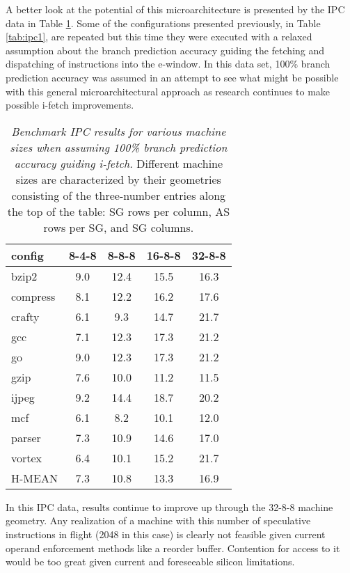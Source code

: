 \documentclass[10pt,dvips]{article}
\begin{document}
A better look at the potential of this microarchitecture is
presented by the IPC data in Table \ref{tab:ipc2}.
Some of the configurations presented previously, 
in Table \ref{tab:ipc1},
are repeated but this time they were executed with a relaxed
assumption about the branch prediction accuracy guiding the
fetching and dispatching of instructions into the e-window.
In this data set, 100\% branch prediction accuracy was
assumed in an attempt to see what might be possible with this
general microarchitectural approach as research continues to
make possible i-fetch improvements.
%
\begin{table}
\begin{center}
\caption{{\em Benchmark IPC results for various machine sizes
when assuming 100\% branch prediction accuracy guiding i-fetch.}
Different machine sizes are characterized by their
geometries consisting of the three-number entries along the
top of the table: SG rows per column, AS rows per SG, and
SG columns.}
\label{tab:ipc2}
\begin{tabular}{|l|c|c|c|c|}
\hline 
config&
8-4-8&8-8-8&16-8-8&32-8-8\\
\hline
\hline 
bzip2&9.0&12.4&15.5&16.3\\
\hline 
compress&8.1&12.2&16.2&17.6\\
\hline 
crafty&6.1&9.3&14.7&21.7\\
\hline 
gcc&7.1&12.3&17.3&21.2\\
\hline 
go&9.0&12.3&17.3&21.2\\
\hline 
gzip&7.6&10.0&11.2&11.5\\
\hline 
ijpeg&9.2&14.4&18.7&20.2\\
\hline 
mcf&6.1&8.2&10.1&12.0\\
\hline 
parser&7.3&10.9&14.6&17.0\\
\hline 
vortex&6.4&10.1&15.2&21.7\\
\hline 
\hline 
H-MEAN&7.3&10.8&13.3&16.9\\
\hline
\end{tabular}
\end{center}
\end{table}
%
In this IPC data, results continue to improve up through the
32-8-8 machine geometry.
Any realization of a machine with this number of speculative
instructions in flight (2048 in this case) is clearly not
feasible given current operand enforcement methods like
a reorder buffer.  Contention for access to it would be too great
given current and foreseeable silicon limitations.
%
%
\end{document}
